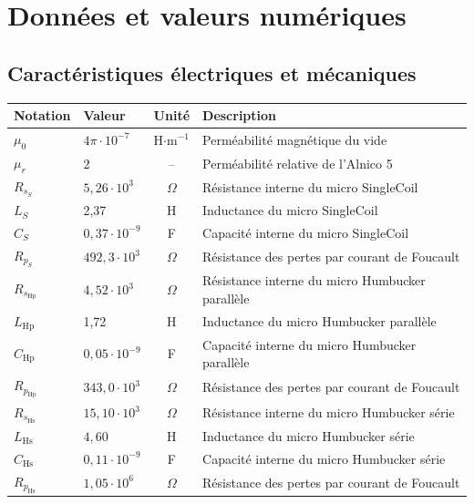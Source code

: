 \documentclass[a4paper,11pt]{article}
\begin{document}
\newpage
\section{Données et valeurs numériques}

\subsection{Caractéristiques électriques et mécaniques}
\begin{center}
\small
\begin{tabularx}{\textwidth}{llcX}
\toprule
\textbf{Notation} & \textbf{Valeur} & \textbf{Unité} & \textbf{Description} \\
\midrule
$\mu_{0}$ & $4\pi \cdot 10^{-7}$ & H$\cdot$m$^{-1}$ & Perméabilité magnétique du vide \\
$\mu_{r}$ & 2 & -- & Perméabilité relative de l'Alnico 5 \\
\midrule
$R_{s_S}$ & $5,26 \cdot 10^3$ & $\Omega$ & Résistance interne du micro SingleCoil \\
$L_{S}$ & 2,37 & H & Inductance du micro SingleCoil \\
$C_{S}$ & $0,37 \cdot 10^{-9}$ & F & Capacité interne du micro SingleCoil \\
$R_{p_S}$ & $492,3 \cdot 10^3$ & $\Omega$ & Résistance des pertes par courant de Foucault \\
\midrule
$R_{s_{\text{Hp}}}$ & $4,52 \cdot 10^3$ & $\Omega$ & Résistance interne du micro Humbucker parallèle \\
$L_{\text{Hp}}$ & 1,72 & H & Inductance du micro Humbucker parallèle \\
$C_{\text{Hp}}$ & $0,05 \cdot 10^{-9}$ & F & Capacité interne du micro Humbucker parallèle \\
$R_{p_{\text{Hp}}}$ & $343,0 \cdot 10^3$ & $\Omega$ & Résistance des pertes par courant de Foucault \\
\midrule
$R_{s_{\text{Hs}}}$ & $15,10 \cdot 10^3$ & $\Omega$ & Résistance interne du micro Humbucker série \\
$L_{\text{Hs}}$ & $4,60$ & H & Inductance du micro Humbucker série \\
$C_{\text{Hs}}$ & $0,11 \cdot 10^{-9}$ & F & Capacité interne du micro Humbucker série \\
$R_{p_{\text{Hs}}}$ & $1,05 \cdot 10^6$ & $\Omega$ & Résistance des pertes par courant de Foucault \\

\end{tabularx}
\end{center}
\end{document}
